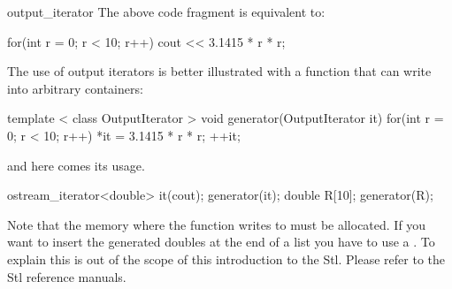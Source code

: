 \begin{ccClass}{output_iterator}
The above code fragment is equivalent to: 

\begin{cprog}
{
    for(int r = 0; r < 10; r++){
        cout << 3.1415 * r * r;  
    }
}
\end{cprog} 

The use of output iterators is better illustrated with a function
that can write into arbitrary containers:

\begin{cprog}
template < class OutputIterator >
void
generator(OutputIterator it)
{
    for(int r = 0; r < 10; r++){
        *it = 3.1415 * r * r;
        ++it;
    }
}
\end{cprog} 

and here comes its usage.

\begin{cprog}
{
    ostream_iterator<double> it(cout);
    generator(it);
    double R[10];
    generator(R);
}
\end{cprog} 

Note that the memory where the function  writes to
must be allocated. If you want to insert the generated doubles at the end
of a list you have to use a . To explain
this is out of the scope of this introduction to the {\sc Stl}. Please
refer to the {\sc Stl} reference manuals.

\end{ccClass} 

